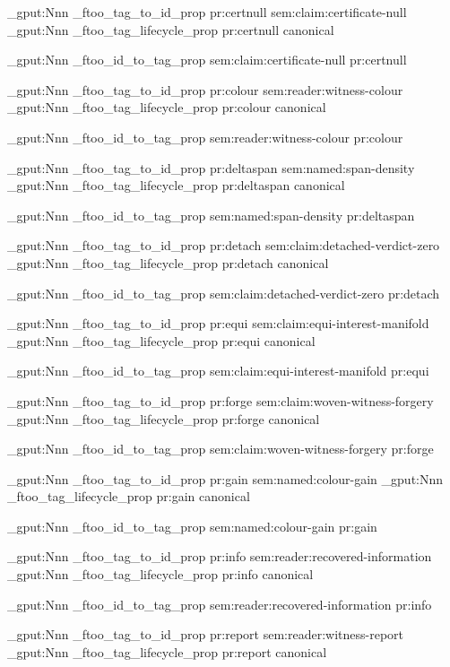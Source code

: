 \prop_gput:Nnn \g_ftoo_tag_to_id_prop { pr:certnull } { sem:claim:certificate-null }
\prop_gput:Nnn \g_ftoo_tag_lifecycle_prop { pr:certnull } { canonical }

\prop_gput:Nnn \g_ftoo_id_to_tag_prop { sem:claim:certificate-null } { pr:certnull }


\prop_gput:Nnn \g_ftoo_tag_to_id_prop { pr:colour } { sem:reader:witness-colour }
\prop_gput:Nnn \g_ftoo_tag_lifecycle_prop { pr:colour } { canonical }

\prop_gput:Nnn \g_ftoo_id_to_tag_prop { sem:reader:witness-colour } { pr:colour }


\prop_gput:Nnn \g_ftoo_tag_to_id_prop { pr:deltaspan } { sem:named:span-density }
\prop_gput:Nnn \g_ftoo_tag_lifecycle_prop { pr:deltaspan } { canonical }

\prop_gput:Nnn \g_ftoo_id_to_tag_prop { sem:named:span-density } { pr:deltaspan }


\prop_gput:Nnn \g_ftoo_tag_to_id_prop { pr:detach } { sem:claim:detached-verdict-zero }
\prop_gput:Nnn \g_ftoo_tag_lifecycle_prop { pr:detach } { canonical }

\prop_gput:Nnn \g_ftoo_id_to_tag_prop { sem:claim:detached-verdict-zero } { pr:detach }


\prop_gput:Nnn \g_ftoo_tag_to_id_prop { pr:equi } { sem:claim:equi-interest-manifold }
\prop_gput:Nnn \g_ftoo_tag_lifecycle_prop { pr:equi } { canonical }

\prop_gput:Nnn \g_ftoo_id_to_tag_prop { sem:claim:equi-interest-manifold } { pr:equi }


\prop_gput:Nnn \g_ftoo_tag_to_id_prop { pr:forge } { sem:claim:woven-witness-forgery }
\prop_gput:Nnn \g_ftoo_tag_lifecycle_prop { pr:forge } { canonical }

\prop_gput:Nnn \g_ftoo_id_to_tag_prop { sem:claim:woven-witness-forgery } { pr:forge }


\prop_gput:Nnn \g_ftoo_tag_to_id_prop { pr:gain } { sem:named:colour-gain }
\prop_gput:Nnn \g_ftoo_tag_lifecycle_prop { pr:gain } { canonical }

\prop_gput:Nnn \g_ftoo_id_to_tag_prop { sem:named:colour-gain } { pr:gain }


\prop_gput:Nnn \g_ftoo_tag_to_id_prop { pr:info } { sem:reader:recovered-information }
\prop_gput:Nnn \g_ftoo_tag_lifecycle_prop { pr:info } { canonical }

\prop_gput:Nnn \g_ftoo_id_to_tag_prop { sem:reader:recovered-information } { pr:info }


\prop_gput:Nnn \g_ftoo_tag_to_id_prop { pr:report } { sem:reader:witness-report }
\prop_gput:Nnn \g_ftoo_tag_lifecycle_prop { pr:report } { canonical }

